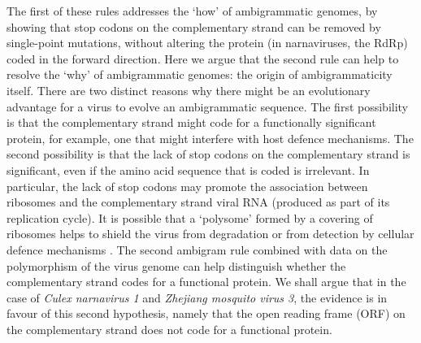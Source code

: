 \documentclass[unnumsec,webpdf,contemporary,large,namedate]{oup-authoring-template}%
\theoremstyle{thmstyleone}%
\theoremstyle{thmstyletwo}%
\theoremstyle{thmstylethree}%
\begin{document}
The first of these rules addresses the \lq how' of  ambigrammatic genomes, by showing that
stop codons on the complementary strand can be removed by single-point mutations, without
altering the protein (in narnaviruses, the RdRp) coded in the forward direction. Here we argue that the
second rule can help to resolve the \lq why' of ambigrammatic genomes:
the origin of ambigrammaticity itself. There are two
distinct reasons why there might be an evolutionary advantage for a virus to evolve an
ambigrammatic sequence. The first possibility is that the complementary strand might code
for a functionally significant protein, for example, one that might interfere with host defence mechanisms.
The second possibility is that the lack of stop codons on the complementary strand
is significant, even if the amino acid sequence that is coded is irrelevant. In particular, the lack of stop codons
may promote the association between ribosomes and the complementary strand viral RNA (produced as part of its
replication cycle). It is possible that a \lq polysome' formed by a covering of ribosomes helps to shield
the virus from degradation or from detection by cellular defence mechanisms \citep{Cep20,Ret+20,Wil+21}.
The second ambigram rule combined with data on the polymorphism of the
virus genome can help distinguish whether the complementary strand codes for a functional protein.
We shall argue that in the case of \emph{Culex narnavirus 1} and \emph{Zhejiang mosquito virus 3}, the evidence
is in favour of this second hypothesis, namely that the open reading frame (ORF) on the complementary strand does
not code for a functional protein.
\end{document}

